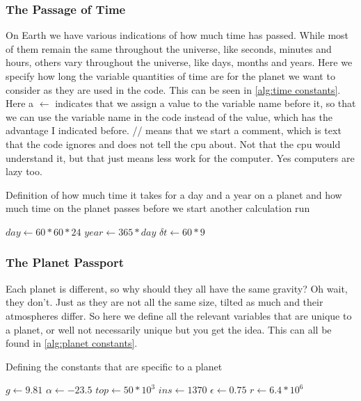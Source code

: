\subsubsection{The Passage of Time}
On Earth we have various indications of how much time has passed. While most of them remain the same throughout the universe, like seconds, minutes and hours, others vary throughout the universe,
like days, months and years. Here we specify how long the variable quantities of time are for the planet we want to consider as they are used in the code. This can be seen in 
\autoref{alg:time constants}. Here a $\leftarrow$ indicates that we assign a value to the variable name before it, so that we can use the variable name in the code instead of the value, which 
has the advantage I indicated before. // means that we start a comment, which is text that the code ignores and does not tell the cpu about. Not that the cpu would understand it, but that just 
means less work for the computer. Yes computers are lazy too.

\begin{algorithm*}
    \caption{Definition of how much time it takes for a day and a year on a planet and how much time on the planet passes before we start another calculation run}
    \label{alg:time constants}
    $day \leftarrow 60*60*24$ 
    $year \leftarrow 365*day$ 
    $\delta t \leftarrow 60 * 9$ 
\end{algorithm*}

\subsubsection{The Planet Passport}
Each planet is different, so why should they all have the same gravity? Oh wait, they don't. Just as they are not all the same size, tilted as much and their atmospheres differ. So here we define
all the relevant variables that are unique to a planet, or well not necessarily unique but you get the idea. This can all be found in \autoref{alg:planet constants}.

\begin{algorithm}
    \caption{Defining the constants that are specific to a planet}
    \label{alg:planet constants}
    $g \leftarrow 9.81$ 
    $\alpha \leftarrow -23.5$ 
    $top \leftarrow 50*10^3$ 
    $ins \leftarrow 1370$ 
    $\epsilon \leftarrow 0.75$ 
    $r \leftarrow 6.4*10^6$ 
\end{algorithm}

